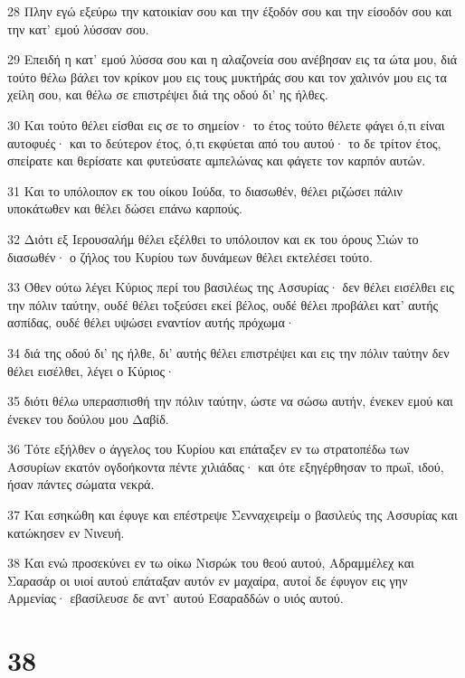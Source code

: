 \par 28 Πλην εγώ εξεύρω την κατοικίαν σου και την έξοδόν σου και την είσοδόν σου και την κατ' εμού λύσσαν σου.
\par 29 Επειδή η κατ' εμού λύσσα σου και η αλαζονεία σου ανέβησαν εις τα ώτα μου, διά τούτο θέλω βάλει τον κρίκον μου εις τους μυκτήράς σου και τον χαλινόν μου εις τα χείλη σου, και θέλω σε επιστρέψει διά της οδού δι' ης ήλθες.
\par 30 Και τούτο θέλει είσθαι εις σε το σημείον· το έτος τούτο θέλετε φάγει ό,τι είναι αυτοφυές· και το δεύτερον έτος, ό,τι εκφύεται από του αυτού· το δε τρίτον έτος, σπείρατε και θερίσατε και φυτεύσατε αμπελώνας και φάγετε τον καρπόν αυτών.
\par 31 Και το υπόλοιπον εκ του οίκου Ιούδα, το διασωθέν, θέλει ριζώσει πάλιν υποκάτωθεν και θέλει δώσει επάνω καρπούς.
\par 32 Διότι εξ Ιερουσαλήμ θέλει εξέλθει το υπόλοιπον και εκ του όρους Σιών το διασωθέν· ο ζήλος του Κυρίου των δυνάμεων θέλει εκτελέσει τούτο.
\par 33 Όθεν ούτω λέγει Κύριος περί του βασιλέως της Ασσυρίας· δεν θέλει εισέλθει εις την πόλιν ταύτην, ουδέ θέλει τοξεύσει εκεί βέλος, ουδέ θέλει προβάλει κατ' αυτής ασπίδας, ουδέ θέλει υψώσει εναντίον αυτής πρόχωμα·
\par 34 διά της οδού δι' ης ήλθε, δι' αυτής θέλει επιστρέψει και εις την πόλιν ταύτην δεν θέλει εισέλθει, λέγει ο Κύριος·
\par 35 διότι θέλω υπερασπισθή την πόλιν ταύτην, ώστε να σώσω αυτήν, ένεκεν εμού και ένεκεν του δούλου μου Δαβίδ.
\par 36 Τότε εξήλθεν ο άγγελος του Κυρίου και επάταξεν εν τω στρατοπέδω των Ασσυρίων εκατόν ογδοήκοντα πέντε χιλιάδας· και ότε εξηγέρθησαν το πρωΐ, ιδού, ήσαν πάντες σώματα νεκρά.
\par 37 Και εσηκώθη και έφυγε και επέστρεψε Σενναχειρείμ ο βασιλεύς της Ασσυρίας και κατώκησεν εν Νινευή.
\par 38 Και ενώ προσεκύνει εν τω οίκω Νισρώκ του θεού αυτού, Αδραμμέλεχ και Σαρασάρ οι υιοί αυτού επάταξαν αυτόν εν μαχαίρα, αυτοί δε έφυγον εις γην Αρμενίας· εβασίλευσε δε αντ' αυτού Εσαραδδών ο υιός αυτού.

\chapter{38}

